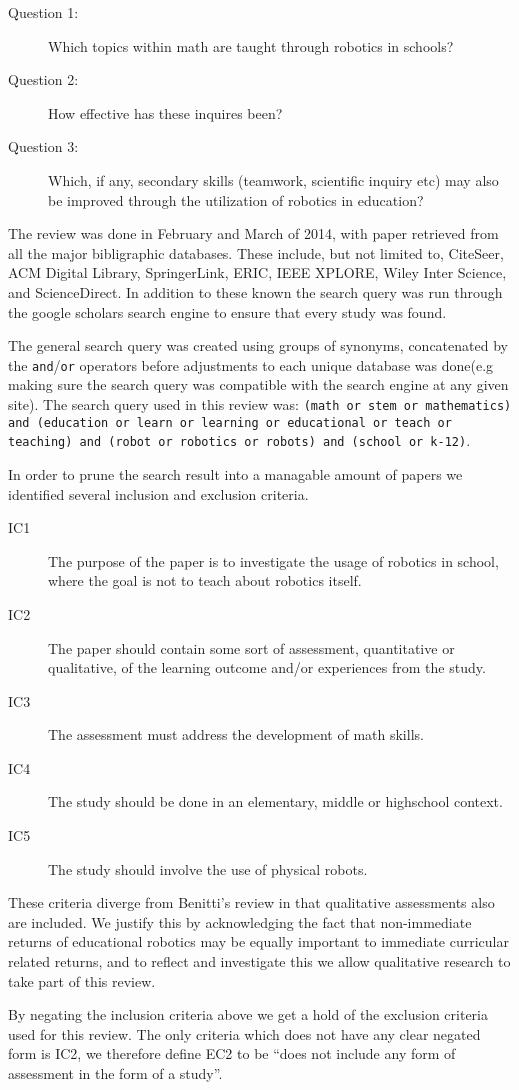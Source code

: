 \begin{description}
	\item[Question 1: ] Which topics within math are taught through robotics in schools?
	\item[Question 2: ] How effective has these inquires been?
	\item[Question 3: ] Which, if any, secondary skills (teamwork, scientific inquiry etc) may also be improved through the utilization of robotics in education?
\end{description}

\bigskip\noindent
The review was done in February and March of 2014, with paper retrieved from all the major bibligraphic databases. These include, but not limited to, CiteSeer, ACM Digital Library, SpringerLink, ERIC, IEEE XPLORE, Wiley Inter Science, and ScienceDirect. In addition to these known the search query was run through the 	google scholars search engine to ensure that every study was found.

\bigskip\noindent
The general search query was created using groups of synonyms, concatenated by the \texttt{and}/\texttt{or} operators before adjustments to each unique database was done(e.g making sure the search query was compatible with the search engine at any given site). The search query used in this review was: \texttt{(math or stem or mathematics) and (education or learn or learning or educational or teach or teaching) and (robot or robotics or robots) and (school or k-12)}. 

\bigskip\noindent
In order to prune the search result into a managable amount of papers we identified several inclusion and exclusion criteria. 
\begin{description}
	\item[IC1] The purpose of the paper is to investigate the usage of robotics in school, where the goal is not to teach about robotics itself.
	\item[IC2] The paper should contain some sort of assessment, quantitative or qualitative, of the learning outcome and/or experiences from the study. 
	\item[IC3] The assessment must address the development of math skills. 
	\item[IC4] The study should be done in an elementary, middle or highschool context.
	\item[IC5] The study should involve the use of physical robots.
\end{description}
These criteria diverge from Benitti's review in that qualitative assessments also are included. 
We justify this by acknowledging the fact that non-immediate returns of educational robotics may be equally important to immediate curricular related returns,
and to reflect and investigate this we allow qualitative research to take part of this review. 	

\bigskip\noindent
By negating the inclusion criteria above we get a hold of the exclusion criteria used for this review. 
The only criteria which does not have any clear negated form is IC2, we therefore define EC2 to be "`does not include any form of assessment in the form of a study"'. 
